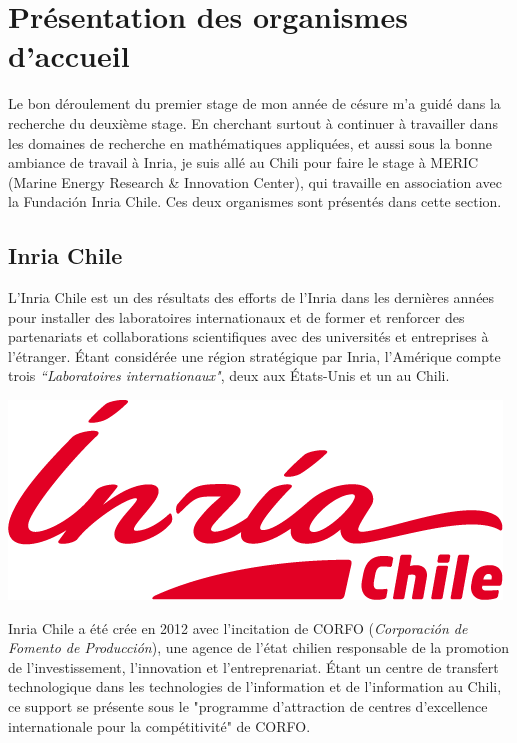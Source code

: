 \section{Présentation des organismes d'accueil}

\indent Le bon déroulement du premier stage de mon année de césure m'a guidé dans la recherche du deuxième stage. En cherchant surtout à continuer à travailler dans les domaines de recherche en mathématiques appliquées, et aussi sous la bonne ambiance de travail à Inria, je suis allé au Chili pour faire le stage à MERIC (Marine Energy Research \& Innovation Center), qui travaille en association avec la Fundación Inria Chile. Ces deux organismes sont présentés dans cette section.

\subsection{Inria Chile}

\indent L'Inria Chile est un des résultats des efforts de l'Inria dans les dernières années pour installer des laboratoires internationaux et de former et renforcer des partenariats et collaborations scientifiques avec des universités et entreprises à l'étranger. Étant considérée une région stratégique par Inria, l'Amérique compte trois \emph{``Laboratoires internationaux"}, deux aux États-Unis et un au Chili.

\indent

\begingroup
\centering
\includegraphics[scale=.3]{figures/logos/Inria-Chile.png}
\endgroup

\indent

\indent Inria Chile a été crée en 2012 avec l'incitation de CORFO (\emph{Corporación de Fomento de Producción}), une agence de l'état chilien responsable de la promotion de l'investissement, l'innovation et l'entreprenariat. Étant un centre de transfert technologique dans les technologies de l'information et de  l'information au Chili, ce support se présente sous le "programme d'attraction de centres d'excellence internationale pour la compétitivité" de CORFO.

